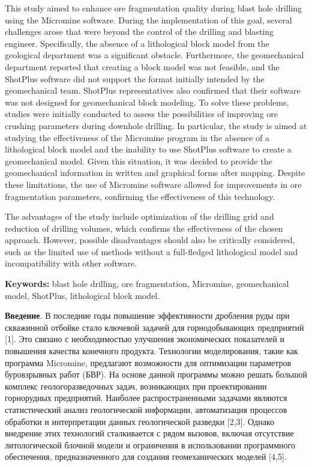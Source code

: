 This study aimed to enhance ore fragmentation quality during blast hole
drilling using the Micromine software. During the implementation of this
goal, several challenges arose that were beyond the control of the
drilling and blasting engineer. Specifically, the absence of a
lithological block model from the geological department was a
significant obstacle. Furthermore, the geomechanical department reported
that creating a block model was not feasible, and the ShotPlus software
did not support the format initially intended by the geomechanical team.
ShotPlus representatives also confirmed that their software was not
designed for geomechanical block modeling. To solve these problems,
studies were initially conducted to assess the possibilities of
improving ore crushing parameters during downhole drilling. In
particular, the study is aimed at studying the effectiveness of the
Micromine program in the absence of a lithological block model and the
inability to use ShotPlus software to create a geomechanical model.
Given this situation, it was decided to provide the geomechanical
information in written and graphical forms after mapping. Despite these
limitations, the use of Micromine software allowed for improvements in
ore fragmentation parameters, confirming the effectiveness of this
technology.

The advantages of the study include optimization of the drilling grid
and reduction of drilling volumes, which confirms the effectiveness of
the chosen approach. However, possible disadvantages should also be
critically considered, such as the limited use of methods without a
full-fledged lithological model and incompatibility with other software.

{\bfseries Keywords:} blast hole drilling, ore fragmentation, Micromine,
geomechanical model, ShotPlus, lithological block model.

{\bfseries Введение}. В последние годы повышение эффективности дробления
руды при скважинной отбойке стало ключевой задачей для горнодобывающих
предприятий {[}1{]}. Это связано с необходимостью улучшения
экономических показателей и повышения качества конечного продукта.
Технологии моделирования, такие как программа Micromine, предлагают
возможности для оптимизации параметров буровзрывных работ (БВР). На
основе данной программы можно решать большой комплекс геологоразведочных
задач, возникающих при проектировании горнорудных предприятий. Наиболее
распространенными задачами являются статистический анализ геологической
информации, автоматизация процессов обработки и интерпретации данных
геологической разведки {[}2,3{]}. Однако внедрение этих технологий
сталкивается с рядом вызовов, включая отсутствие литологической блочной
модели и ограничения в использовании программного обеспечения,
предназначенного для создания геомеханических моделей {[}4,5{]}.


